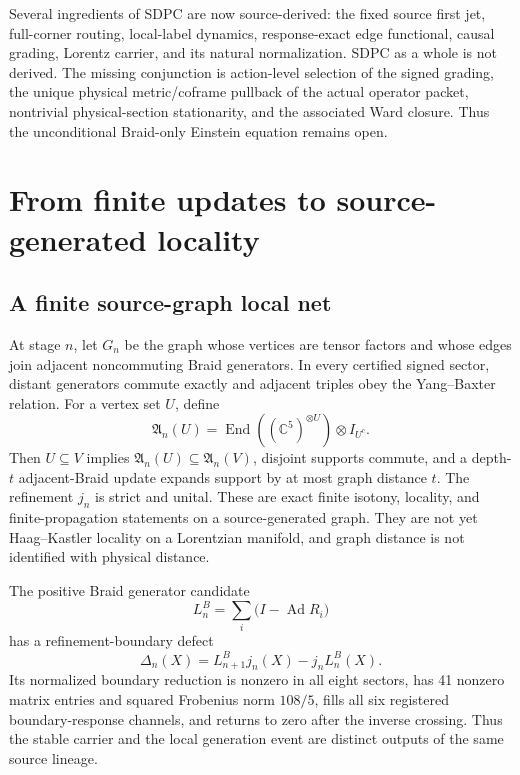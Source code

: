 \documentclass[11pt]{article}
\theoremstyle{definition}
\theoremstyle{remark}
\newcommand{\Ad}{\operatorname{Ad}}
\begin{document}
Several ingredients of SDPC are now source-derived: the fixed source first jet, full-corner routing, local-label dynamics, response-exact edge functional, causal grading, Lorentz carrier, and its natural normalization. SDPC as a whole is not derived. The missing conjunction is action-level selection of the signed grading, the unique physical metric/coframe pullback of the actual operator packet, nontrivial physical-section stationarity, and the associated Ward closure. Thus the unconditional Braid-only Einstein equation remains open.

\section{From finite updates to source-generated locality}

\subsection{A finite source-graph local net}

At stage $n$, let $G_n$ be the graph whose vertices are tensor factors and whose edges join adjacent noncommuting Braid generators. In every certified signed sector, distant generators commute exactly and adjacent triples obey the Yang--Baxter relation. For a vertex set $U$, define
\begin{equation}\label{eq:localnet}
 \mathfrak A_n(U)=\operatorname{End}\!\left((\mathbb C^5)^{\otimes U}\right)\otimes I_{U^c}.
\end{equation}
Then $U\subseteq V$ implies $\mathfrak A_n(U)\subseteq\mathfrak A_n(V)$, disjoint supports commute, and a depth-$t$ adjacent-Braid update expands support by at most graph distance $t$. The refinement $j_n$ is strict and unital. These are exact finite isotony, locality, and finite-propagation statements on a source-generated graph. They are not yet Haag--Kastler locality on a Lorentzian manifold, and graph distance is not identified with physical distance.

The positive Braid generator candidate
\begin{equation}\label{eq:braidgenerator}
 L_n^B=\sum_i\bigl(I-\Ad R_i\bigr)
\end{equation}
has a refinement-boundary defect
\begin{equation}\label{eq:boundarydefect}
 \Delta_n(X)=L_{n+1}^Bj_n(X)-j_nL_n^B(X).
\end{equation}
Its normalized boundary reduction is nonzero in all eight sectors, has 41 nonzero matrix entries and squared Frobenius norm $108/5$, fills all six registered boundary-response channels, and returns to zero after the inverse crossing. Thus the stable carrier and the local generation event are distinct outputs of the same source lineage.
\end{document}
